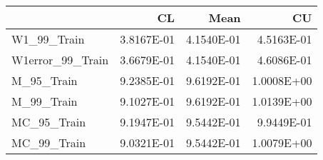 \begin{tabular}{lrrr}
\toprule
{} &         CL &       Mean &         CU \\
\midrule
W1\_99\_Train      & 3.8167E-01 & 4.1540E-01 & 4.5163E-01 \\
W1error\_99\_Train & 3.6679E-01 & 4.1540E-01 & 4.6086E-01 \\
M\_95\_Train       & 9.2385E-01 & 9.6192E-01 & 1.0008E+00 \\
M\_99\_Train       & 9.1027E-01 & 9.6192E-01 & 1.0139E+00 \\
MC\_95\_Train      & 9.1947E-01 & 9.5442E-01 & 9.9449E-01 \\
MC\_99\_Train      & 9.0321E-01 & 9.5442E-01 & 1.0079E+00 \\
\bottomrule
\end{tabular}
